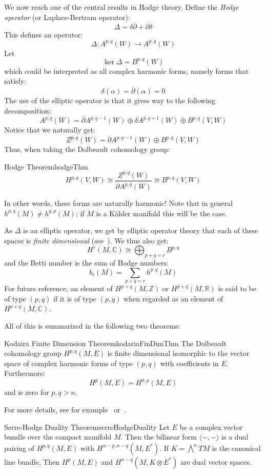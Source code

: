 \documentclass{ut-thesis}
\newenvironment{Proof}[1][]
  {\begin{ProofTcb}[#1]}
  {\end{ProofTcb}}
\newcommand{\R}{{\mathbb{R}}}
\newcommand{\Z}{{\mathbb{Z}}}
\newcommand{\C}{{\mathbb{C}}}
\begin{document}
We now reach one of the central results in Hodge theory. Define the \emph{Hodge operator} (or Laplace-Bertram
operator):
\[
  \Delta = \delta\overline{\partial} + \overline{\partial}\delta
\]
This defines an operator:
\[
  \Delta: A^{p,q}(W) \to A^{p,q}(W)
\]
Let
\[
  \ker\Delta = B^{p,q}(W)
\]
which could be interpreted as all complex harmonic forms, namely forms that satisfy:
\[
  \delta(\alpha) = \overline{\partial}(\alpha) = 0
\]
The use of the elliptic operator is that it gives way to the following decomposition:
\[
  A^{p,q}(W) = \overline{\partial}A^{p, q-1}(W) \oplus \delta A^{p, q+1}(W) \oplus B^{p,q}(V,W)
\]
Notice that we naturally get:
\[
  Z^{p,q}(W) = \overline{\partial}A^{p, q-1}(W) \oplus B^{p,q}(V,W)
\]
Thus, when taking the Dolbeault cohomology group:
\begin{thm}{Hodge Theorem}{hodgeThm}
  \[
  H^{p,q}(V,W) \cong \frac{Z^{p,q}(W)}{\overline{\partial}A^{p,q}(W)} \cong B^{p,q}(V,W)
\]
\end{thm}

In other words, these forms are naturally harmonic!
Note that in general $h^{p,q}(M) \ne h^{q,p}(M)$; if $M$ is a K\"ahler manifold this will be the case.

As $\Delta$ is an elliptic operator, we get by elliptic operator theory that each of these spaces is
\emph{finite dimensional} (see~\cite{HodgeTheory2014}). We thus also get:
\[
  H^r(M, \C) \cong \bigoplus_{p+q=r} B^{p,q}
\]
and the Betti number is the sum of Hodge numbers:
\[
  b_r(M) = \sum_{p+q=r} h^{p,q}(M)
\]
For future reference, an element of $H^{p+q}(M, \Z)$ or $H^{p+q}(M, \R)$ is said to be of type $(p,q)$ if it
is of type $(p,q)$ when regarded as an element of $H^{p+q}(M, \C)$.

All of this is summarized in the following two theorems:

\begin{thm}{Kodaira Finite Dimension Theorem}{kodariaFinDimThm}
   The Dolbeault cohomology group $H^{p,q}(M,E)$ is finite dimensional
  isomorphic to the vector space of complex harmonic forms of type $(p,q)$ with coefficients in $E$.
  Furthermore:
  \[
    H^p(M,E) = H^{0,p}(M,E)
  \]
  and is zero for $p,q > n$.
\end{thm}

\begin{Proof}
  For more details, see for example~\cite{HodgeTheory2014} or~\cite{voisinHodgeTheoryComplex2002}.
\end{Proof}

\begin{thm}{Serre-Hodge Duality Theorem}{serreHodgeDuality}
  Let $E$ be a complex vector bundle over the compact manifold $M$. Then the bilinear form $\langle -,-
  \rangle$ is a dual pairing of $H^{p,q}(M,E)$ with $H^{n-p, n-q}(M, E^*)$. If $K = \bigwedge^n TM$ is the
  canonical line bundle, Then $H^p(M,E)$ and $H^{n-q}(M, K\otimes E^*)$ are dual vector spaces.
\end{thm}
\end{document}
